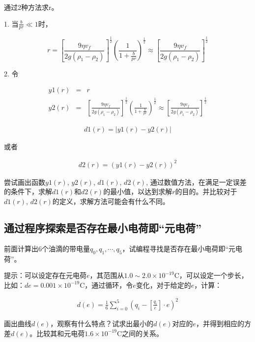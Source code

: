 通过2种方法求r。

1. 当$\frac{b}{pr} \ll 1$时，

\begin{equation}
r=\left[ \frac{9\eta v_f}{2g\left( \rho _1-\rho _2 \right)} \right] ^{\frac{1}{2}}\left( \frac{1}{1+\frac{b}{pr}} \right) ^{\frac{1}{2}}\approx \left[ \frac{9\eta v_f}{2g\left( \rho _1-\rho _2 \right)} \right] ^{\frac{1}{2}}
\end{equation}

2. 令

\begin{eqnarray}
y1(r) &=& r \\
y2(r) &=& \left[ \frac{9\eta v_f}{2g\left( \rho _1-\rho _2 \right)} \right] ^{\frac{1}{2}}\left( \frac{1}{1+\frac{b}{pr}} \right) ^{\frac{1}{2}}\approx \left[ \frac{9\eta v_f}{2g\left( \rho _1-\rho _2 \right)} \right] ^{\frac{1}{2}}
\end{eqnarray}

\begin{eqnarray}
d1(r) = \left|y1(r) - y2(r)\right|
\end{eqnarray}

或者

\begin{eqnarray}
d2(r) = \left(y1(r) - y2(r)\right)^2
\end{eqnarray}

尝试画出函数$y1(r)$, $y2(r)$, $d1(r)$, $d2(r)$, 通过数值方法，在满足一定误差的条件下，求解$d1(r)$和$d2(r)$的最小值，以达到求解$r$的目的。并比较对于$d1(r)$, $d2(r)$的定义，求解方法可能会有什么不同。

\subsection{通过程序探索是否存在最小电荷即“元电荷”}

前面计算出6个油滴的带电量$q_0, q_1, \cdots, q_5$，试编程寻找是否存在最小电荷即“元电荷”。

提示：可以设定存在元电荷$e$，其范围从$1.0 \sim 2.0 \times 10^{-19} \mathrm{C}$，可以设定一个步长，比如：$de = 0.001 \times 10^{-19} \mathrm{C}$，通过循环，令$e$变化，对于给定的$e$，计算：

\begin{eqnarray}
d(e) = \frac{1}{6}\sum\limits_{i=0}^{5} \left( q_i - \left[ \frac{q_i}{e} \right] \cdot e \right)^2
\end{eqnarray}

画出曲线$d(e)$，观察有什么特点？试求出最小的$d(e)$对应的$e$，并得到相应的方差$d(e)$。比较其和元电荷$1.6 \times 10^{-19}\mathrm{C}$之间的关系。

